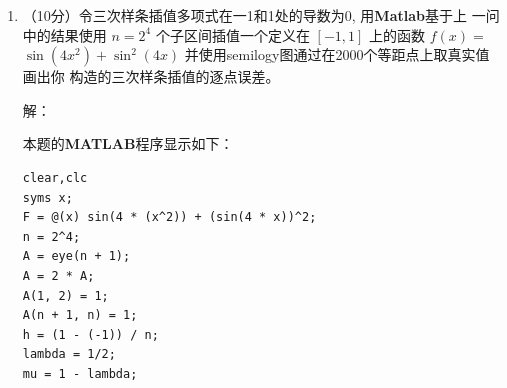 \documentclass[12pt,a4paper,UTF8]{ctexart}
\theoremstyle{nonumberplain}
\begin{document}
\begin{enumerate}
\begin{enumerate}
$$\begin{array}{cccccc}
                                \mu _{1} & 2        & \lambda_{1} &             &        &               \\
                                         & \mu _{2} & 2           & \lambda_{2} &        &               \\
                                         &          & \ddots      & \ddots      & \ddots &               \\
                                         &          &             & \mu _{n-2}  & 2      & \lambda_{n-1} \\
                                         &          &             &             & 1      & 2
                            \end{array}\right]\left[\begin{array}{c}
                                M_{0}   \\
                                M_{1}   \\
                                M_{2}   \\
                                \vdots  \\
                                M_{n-1} \\
                                M_{n}
                            \end{array}\right]=\left[\begin{array}{c}
                                d_{0}   \\
                                d_{1}   \\
                                d_{2}   \\
                                \vdots  \\
                                d_{n-1} \\
                                d_{n}
                            \end{array}\right]
                    $$
              \item（10分）令三次样条插值多项式在一1和1处的导数为0, 用\textbf{Matlab}基于上
                    一问中的结果使用 $n=2^{4}$ 个子区间插值一个定义在 $[-1,1]$ 上的函数 $f(x)=$ $\sin \left(4 x^{2}\right)+\sin ^{2}(4 x)$ 并使用semilogy图通过在2000个等距点上取真实值画出你 构造的三次样条插值的逐点误差。
                    \par 解：
                    \par 本题的\textbf{MATLAB}程序显示如下：
                    \begin{lstlisting}[frame=single]
clear,clc
syms x;
F = @(x) sin(4 * (x^2)) + (sin(4 * x))^2;
n = 2^4;
A = eye(n + 1);
A = 2 * A;
A(1, 2) = 1;
A(n + 1, n) = 1;
h = (1 - (-1)) / n;
lambda = 1/2;
mu = 1 - lambda;


\end{lstlisting}
\end{enumerate}
\end{enumerate}
\end{document}
